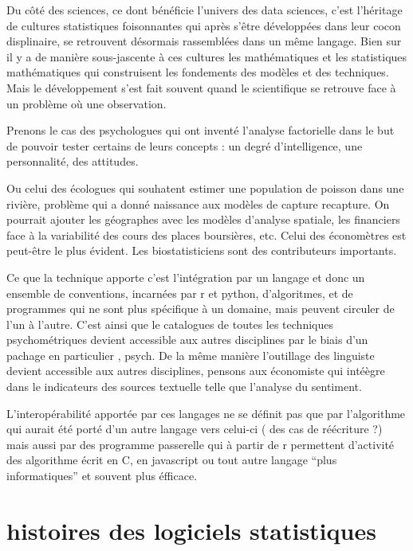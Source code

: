 \documentclass[
]{book}
\begin{document}
Du côté des sciences, ce dont bénéficie l'univers des data sciences, c'est l'héritage de cultures statistiques foisonnantes qui après s'être développées dans leur cocon displinaire, se retrouvent désormais rassemblées dans un même langage. Bien sur il y a de manière sous-jascente à ces cultures les mathématiques et les statistiques mathématiques qui construisent les fondements des modèles et des techniques. Mais le développement s'est fait souvent quand le scientifique se retrouve face à un problème où une observation.

Prenons le cas des psychologues qui ont inventé l'analyse factorielle dans le but de pouvoir tester certains de leurs concepts : un degré d'intelligence, une personnalité, des attitudes.

Ou celui des écologues qui souhatent estimer une population de poisson dans une rivière, problème qui a donné naissance aux modèles de capture recapture. On pourrait ajouter les géographes avec les modèles d'analyse spatiale, les financiers face à la variabilité des cours des places boursières, etc. Celui des économètres est peut-être le plus évident. Les biostatisticiens sont des contributeurs importants.

Ce que la technique apporte c'est l'intégration par un langage et donc un ensemble de conventions, incarnées par r et python, d'algoritmes, et de programmes qui ne sont plus spécifique à un domaine, mais peuvent circuler de l'un à l'autre. C'est ainsi que le catalogues de toutes les techniques psychométriques devient accessible aux autres disciplines par le biais d'un pachage en particulier , psych. De la même manière l'outillage des linguiste devient accessible aux autres disciplines, pensons aux économiste qui intéègre dans le indicateurs des sources textuelle telle que l'analyse du sentiment.

L'interopérabilité apportée par ces langages ne se définit pas que par l'algorithme qui aurait été porté d'un autre langage vers celui-ci ( des cas de réécriture ?) mais aussi par des programme passerelle qui à partir de r permettent d'activité des algorithme écrit en C, en javascript ou tout autre langage ``plus informatiques'' et souvent plus éfficace.

\hypertarget{histoires-des-logiciels-statistiques}{%
\section{histoires des logiciels statistiques}\label{histoires-des-logiciels-statistiques}}
\end{document}
